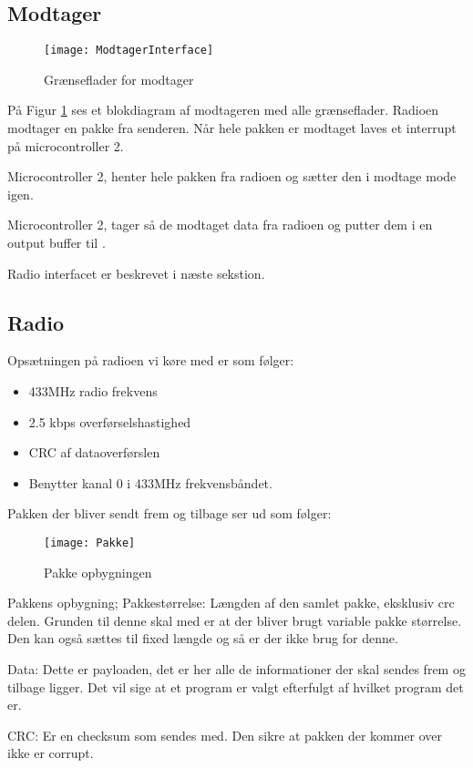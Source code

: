 \documentclass[Main]{subfiles}
\begin{document}
\subsection{Modtager}

\begin{figure}[H]
\centering
\texttt{[image: ModtagerInterface]}
\caption{Grænseflader for modtager}
\label{fig: ModtagerInterface}
\end{figure}
På Figur \ref{fig: ModtagerInterface} ses et blokdiagram af modtageren med alle grænseflader.
Radioen modtager en pakke fra senderen. Når hele pakken er modtaget laves et interrupt på microcontroller 2.

Microcontroller 2, henter hele pakken fra radioen og sætter den i modtage mode igen. 

Microcontroller 2, tager så de modtaget data fra radioen og putter dem i en output buffer til \itoc.

Radio interfacet er beskrevet i næste sekstion.


\subsection{Radio}
Opsætningen på radioen vi køre med er som følger:
\begin{itemize}
\item 433MHz radio frekvens
\item 2.5 kbps overførselshastighed
\item CRC af dataoverførslen
\item Benytter kanal 0 i 433MHz frekvensbåndet.
\end{itemize}


Pakken der bliver sendt frem og tilbage ser ud som følger:
\begin{figure}[H]
\centering
\texttt{[image: Pakke]}
\caption{Pakke opbygningen}
\label{fig: Pakke}
\end{figure}

Pakkens opbygning;
Pakkestørrelse: Længden af den samlet pakke, eksklusiv crc delen. Grunden til denne skal med er at der bliver brugt variable pakke størrelse. Den kan også sættes til fixed længde og så er der ikke brug for denne.

Data: Dette er payloaden, det er her alle de informationer der skal sendes frem og tilbage ligger. Det vil sige at et program er valgt efterfulgt af hvilket program det er.

CRC: Er en checksum som sendes med. Den sikre at pakken der kommer over ikke er corrupt.
\end{document}
